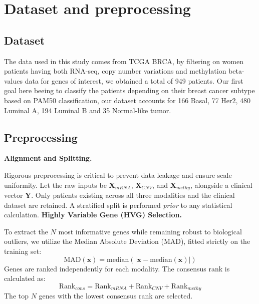 \documentclass[10pt, twocolumn]{article}
\begin{document}
\section{Dataset and preprocessing}

\subsection{Dataset}

The data used in this study comes from TCGA BRCA, by filtering on women patients having both RNA-seq, copy number variations and methylation beta-values data for genes of interest, we obtained a total of 949 patients. Our first goal here beeing to classify the patients depending on their breast cancer subtype based on PAM50 classification, our dataset accounts for 166 Basal, 77 Her2, 480 Luminal A, 194 Luminal B and 35 Normal-like tumor. 

\subsection{Preprocessing}

\textbf{Alignment and Splitting.} 

Rigorous preprocessing is critical to prevent data leakage and ensure scale uniformity. Let the raw inputs be $\mathbf{X}_{mRNA}$, $\mathbf{X}_{CNV}$, and $\mathbf{X}_{methy}$, alongside a clinical vector $\mathbf{Y}$. Only patients existing across all three modalities and the clinical dataset are retained. A stratified split is performed \textit{prior} to any statistical calculation.\vspace{0.3cm}
\noindent
\textbf{Highly Variable Gene (HVG) Selection.} 

To extract the $N$ most informative genes while remaining robust to biological outliers, we utilize the Median Absolute Deviation (MAD), fitted strictly on the training set:
\begin{equation}
    \text{MAD}(\mathbf{x}) = \text{median}(|\mathbf{x} - \text{median}(\mathbf{x})|)
\end{equation}
Genes are ranked independently for each modality. The consensus rank is calculated as:
\begin{equation}
    \text{Rank}_{cons} = \text{Rank}_{mRNA} + \text{Rank}_{CNV} + \text{Rank}_{methy}
\end{equation}
The top $N$ genes with the lowest consensus rank are selected.\vspace{0.3cm}
\end{document}

